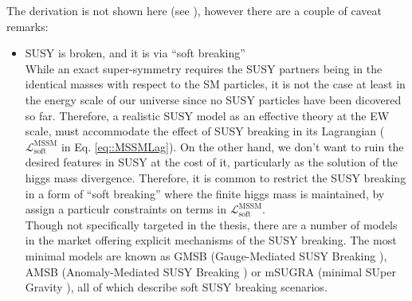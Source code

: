 The derivation is not shown here (see \cite{SUSYPrimer}), however there are a couple of caveat remarks:
\begin{itemize}
\item SUSY is broken, and it is via ``soft breaking'' \\
While an exact super-symmetry requires the SUSY partners being in the identical masses with respect to the SM particles, it is not the case at least in the energy scale of our universe since no SUSY particles have been dicovered so far. Therefore, a realistic SUSY model as an effective theory at the EW scale, must accommodate the effect of SUSY breaking in its Lagrangian ($\mathcal{L}^{\mathrm{MSSM}}_{\mathrm{soft}}$ in Eq. \ref{eq::MSSMLag}). On the other hand, we don't want to ruin the desired features in SUSY at the cost of it, particularly as the solution of the higgs mass divergence. Therefore, it is common to restrict the SUSY breaking in a form of ``soft breaking'' where the finite higgs mass is maintained, by assign a particulr constraints on terms in $\mathcal{L}^{\mathrm{MSSM}}_{\mathrm{soft}}$. \\

Though not specifically targeted in the thesis, there are a number of models in the market offering explicit mechanisms of the SUSY breaking. The most minimal models are known as GMSB (Gauge-Mediated SUSY Breaking \cite{GMSB}), AMSB (Anomaly-Mediated SUSY Breaking \cite{AMSB1}\cite{AMSB2}) or mSUGRA (minimal SUper Gravity \cite{SUGRA}), all of which describe soft SUSY breaking scenarios. \\



\end{itemize}
